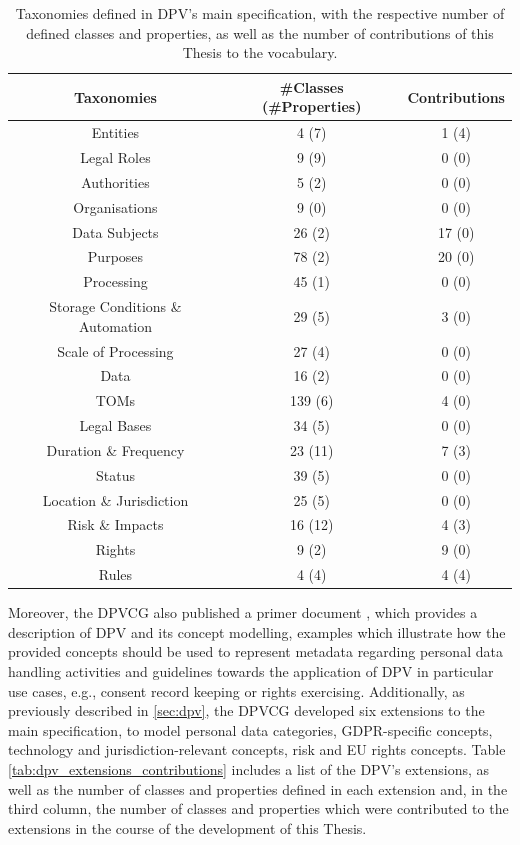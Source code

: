 \begin{table}[htbp]
\centering
\caption[Taxonomies defined in DPV's main specification.]{Taxonomies defined in DPV's main specification, with the respective number of defined classes and properties, as well as the number of contributions of this Thesis to the vocabulary.}
\label{tab:dpv_main_contributions} 
\begin{tabular}{ c||c|c}
 Taxonomies & \#Classes (\#Properties)  & Contributions \\
 \hline\hline
 Entities & 4 (7) & 1 (4) \\
 \hline
 Legal Roles & 9 (9) & 0 (0) \\
 \hline
 Authorities & 5 (2) & 0 (0) \\
 \hline
 Organisations & 9 (0) & 0 (0) \\
 \hline
 Data Subjects & 26 (2) & 17 (0) \\
 \hline
 Purposes & 78 (2) & 20 (0) \\
 \hline
 Processing & 45 (1) & 0 (0) \\
 \hline
 Storage Conditions \& Automation & 29 (5) & 3 (0) \\
 \hline
 Scale of Processing & 27 (4) & 0 (0) \\
 \hline
 Data & 16 (2) & 0 (0) \\
 \hline
 TOMs & 139 (6) & 4 (0) \\
 \hline
 Legal Bases & 34 (5) & 0 (0) \\
 \hline
 Duration \& Frequency & 23 (11) & 7 (3) \\
 \hline
 Status & 39 (5) & 0 (0) \\
 \hline
 Location \& Jurisdiction & 25 (5) & 0 (0) \\
 \hline
 Risk \& Impacts & 16 (12) & 4 (3) \\
 \hline
 Rights & 9 (2) & 9 (0) \\
 \hline
 Rules & 4 (4) & 4 (4) \\
\end{tabular}
\end{table}

Moreover, the DPVCG also published a primer document \citep{pandit_primer_2022}, which provides a description of DPV and its concept modelling, examples which illustrate how the provided concepts should be used to represent metadata regarding personal data handling activities and guidelines towards the application of DPV in particular use cases, e.g., consent record keeping or rights exercising.
Additionally, as previously described in \ref{sec:dpv}, the DPVCG developed six extensions to the main specification, to model personal data categories, GDPR-specific concepts, technology and jurisdiction-relevant concepts, risk and EU rights concepts.
Table \ref{tab:dpv_extensions_contributions} includes a list of the DPV's extensions, as well as the number of classes and properties defined in each extension and, in the third column, the number of classes and properties which were contributed to the extensions in the course of the development of this Thesis.

